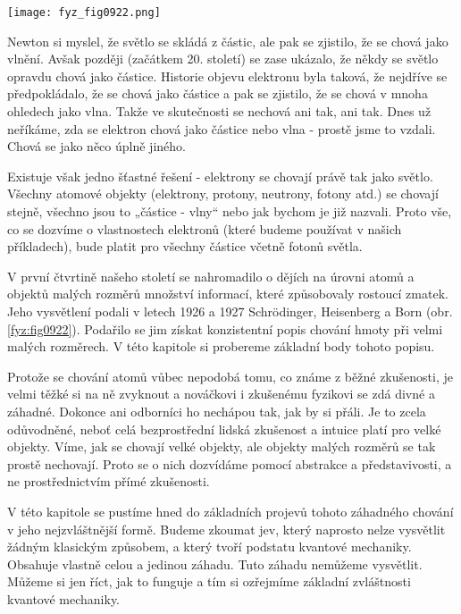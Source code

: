     \begin{figure*}[ht!] %
      \centering
      \texttt{[image: fyz\_fig0922.png]}
      \caption{Zleva: \MaxBorn \ErwinSchrodinger \WernerHeisenberg}
      \label{fyz:fig0922}
    \end{figure*}

    Newton si myslel, že světlo se skládá z částic, ale pak se zjistilo, že se chová jako vlnění.
    Avšak později (začátkem 20. století) se zase ukázalo, že někdy se světlo opravdu chová jako
    částice. Historie objevu elektronu byla taková, že nejdříve se předpokládalo, že se chová jako
    částice a pak se zjistilo, že se chová v mnoha ohledech jako vlna. Takže ve skutečnosti se nechová
    ani tak, ani tak. Dnes už neříkáme, zda se elektron chová jako částice nebo vlna - prostě jsme to
    vzdali. Chová se jako něco úplně jiného.
    
    Existuje však jedno šťastné řešení - elektrony se chovají právě tak jako světlo. Všechny atomové
    objekty (elektrony, protony, neutrony, fotony atd.) se chovají stejně, všechno jsou to „částice -
    vlny“ nebo jak bychom je již nazvali. Proto vše, co se dozvíme o vlastnostech elektronů (které
    budeme používat v našich příkladech), bude platit pro všechny částice včetně fotonů světla.
    
    V první čtvrtině našeho století se nahromadilo o dějích na úrovni atomů a objektů malých rozměrů
    množství informací, které způsobovaly rostoucí zmatek. Jeho vysvětlení podali v letech 1926 a 1927
    Schrödinger, Heisenberg a Born (obr. \ref{fyz:fig0922}). Podařilo se jim získat konzistentní popis
    chování hmoty při velmi malých rozměrech. V této kapitole si probereme základní body tohoto
    popisu.

    Protože se chování atomů vůbec nepodobá tomu, co známe z běžné zkušenosti, je velmi těžké si na ně
    zvyknout a nováčkovi i zkušenému fyzikovi se zdá divné a záhadné. Dokonce ani odborníci ho
    nechápou tak, jak by si přáli. Je to zcela odůvodněné, neboť celá bezprostřední lidská zkušenost a
    intuice platí pro velké objekty. Víme, jak se chovají velké objekty, ale objekty malých rozměrů se
    tak prostě nechovají. Proto se o nich dozvídáme pomocí abstrakce a představivosti, a ne
    prostřednictvím přímé zkušenosti.
    
    V této kapitole se pustíme hned do základních projevů tohoto záhadného chování v jeho
    nejzvláštnější formě. Budeme zkoumat jev, který naprosto nelze vysvětlit žádným klasickým
    způsobem, a který tvoří podstatu kvantové mechaniky. Obsahuje vlastně celou a jedinou záhadu. Tuto
    záhadu nemůžeme vysvětlit. Můžeme si jen říct, jak to funguje a tím si ozřejmíme základní
    zvláštnosti kvantové mechaniky.

